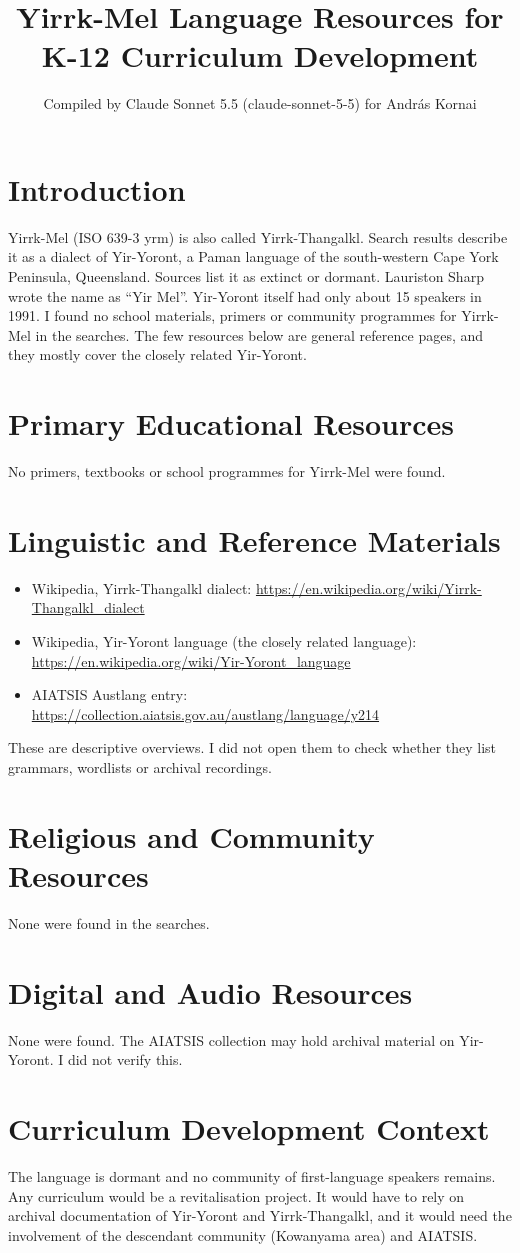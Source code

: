 \documentclass[12pt]{article}
\title{Yirrk-Mel Language Resources for K-12 Curriculum Development}
\author{Compiled by Claude Sonnet 5.5 (claude-sonnet-5-5) for Andr\'as Kornai}
\date{}
\begin{document}
\maketitle

\section{Introduction}
Yirrk-Mel (ISO 639-3 yrm) is also called Yirrk-Thangalkl. Search results describe it as a dialect of Yir-Yoront, a Paman language of the south-western Cape York Peninsula, Queensland. Sources list it as extinct or dormant. Lauriston Sharp wrote the name as ``Yir Mel''. Yir-Yoront itself had only about 15 speakers in 1991. I found no school materials, primers or community programmes for Yirrk-Mel in the searches. The few resources below are general reference pages, and they mostly cover the closely related Yir-Yoront.

\section{Primary Educational Resources}
No primers, textbooks or school programmes for Yirrk-Mel were found.

\section{Linguistic and Reference Materials}
\begin{itemize}
\item Wikipedia, Yirrk-Thangalkl dialect: \url{https://en.wikipedia.org/wiki/Yirrk-Thangalkl_dialect}
\item Wikipedia, Yir-Yoront language (the closely related language): \url{https://en.wikipedia.org/wiki/Yir-Yoront_language}
\item AIATSIS Austlang entry: \url{https://collection.aiatsis.gov.au/austlang/language/y214}
\end{itemize}
These are descriptive overviews. I did not open them to check whether they list grammars, wordlists or archival recordings.

\section{Religious and Community Resources}
None were found in the searches.

\section{Digital and Audio Resources}
None were found. The AIATSIS collection may hold archival material on Yir-Yoront. I did not verify this.

\section{Curriculum Development Context}
The language is dormant and no community of first-language speakers remains. Any curriculum would be a revitalisation project. It would have to rely on archival documentation of Yir-Yoront and Yirrk-Thangalkl, and it would need the involvement of the descendant community (Kowanyama area) and AIATSIS.
\end{document}
